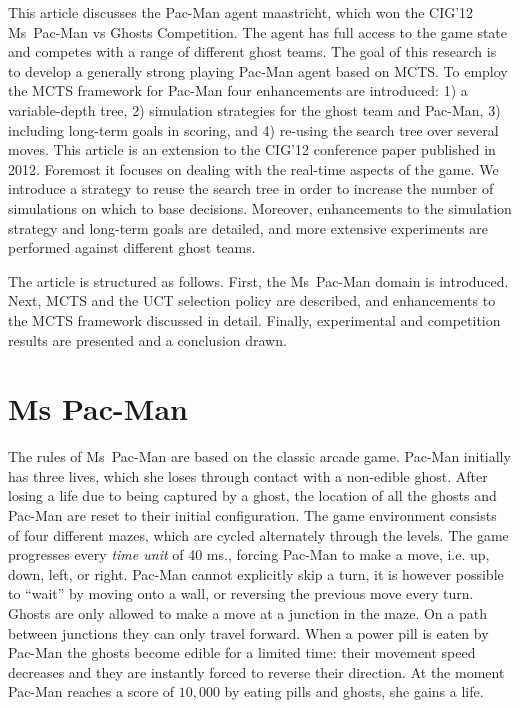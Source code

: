 \documentclass[journal]{IEEEtran}
\begin{document}
This article discusses the Pac-Man agent {\sc maastricht}, which won the CIG'12 Ms~Pac-Man vs Ghosts Competition. The agent has full access to the game state and competes with a range of different ghost teams. The goal of this research is to develop a generally strong playing Pac-Man agent based on MCTS. To employ the MCTS framework for Pac-Man four enhancements are introduced: 1) a variable-depth tree, 2) simulation strategies for the ghost team and Pac-Man, 3) including long-term goals in scoring, and 4) re-using the search tree over several moves.
This article is an extension to the CIG'12 conference paper \cite{enhancementspacmancig12} published in 2012. Foremost it focuses on dealing with the real-time aspects of the game. We introduce a strategy to reuse the search tree in order to increase the number of simulations on which to base decisions. Moreover, enhancements to the simulation strategy and long-term goals are detailed, and more extensive experiments are performed against different ghost teams.

The article is structured as follows. First, the Ms~Pac-Man domain is introduced. Next, MCTS and the UCT selection policy are described, and enhancements to the MCTS framework discussed in detail. Finally, experimental and competition results are presented and a conclusion drawn.

\section{Ms Pac-Man}
\label{rules}
The rules of Ms~Pac-Man are based on the classic arcade game. Pac-Man initially has three lives, which she loses through contact with a non-edible ghost. After losing a life due to being captured by a ghost, the location of all the ghosts and Pac-Man are reset to their initial configuration. The game environment consists of four different mazes, which are cycled alternately through the levels. The game progresses every \emph{time unit} of 40 ms., forcing Pac-Man to make a move, i.e. up, down, left, or right. Pac-Man cannot explicitly skip a turn, it is however possible to ``wait'' by moving onto a wall, or reversing the previous move every turn. Ghosts are only allowed to make a move at a junction in the maze. On a path between junctions they can only travel forward. When a power pill is eaten by Pac-Man the ghosts become edible for a limited time: their movement speed decreases and they are instantly forced to reverse their direction. At the moment Pac-Man reaches a score of $10,000$ by eating pills and ghosts, she gains a life. 
\end{document}
